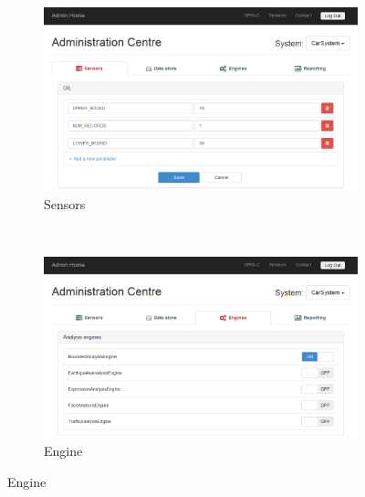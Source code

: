 \documentclass[10pt,a4paper]{article}
\begin{document}
\begin{figure}[h!b]
    \begin{subfigure}{0.49\textwidth}
        \includegraphics[width=\textwidth]{images/admin-centre_sensors.png}
        \caption{Sensors}
        \label{fig:admin-centre_sensors}
    \end{subfigure}
    ~
    \begin{subfigure}{0.49\textwidth}
        \includegraphics[width=\textwidth]{images/admin-centre_engines.png}
        \caption{Engine}
        \label{fig:admin-centre_engines}
    \end{subfigure}
	\vspace{0.3cm}


\end{figure}
\end{document}

